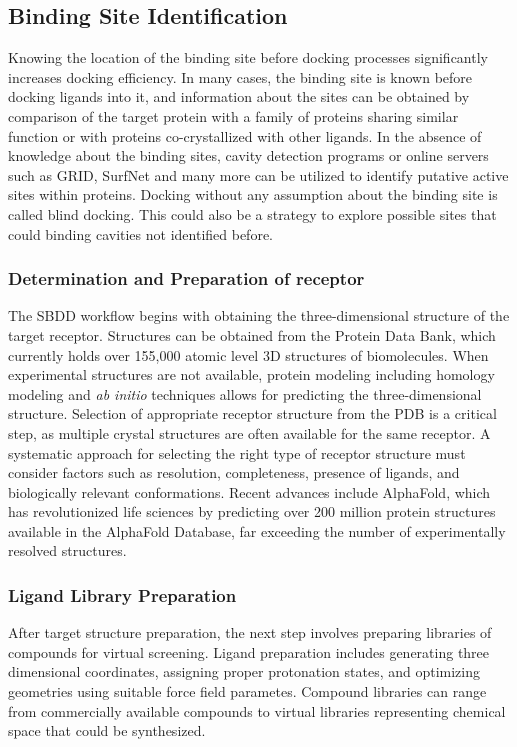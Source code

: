\documentclass[12pt, a4paper]{article}
\begin{document}
\subsection{Binding Site Identification}
Knowing the location of the binding site before docking processes significantly increases docking efficiency. In many cases, the binding site is known before docking ligands into it, and information about the sites can be obtained by comparison of the target protein with a family of proteins sharing similar function or with proteins co-crystallized with other ligands. In the absence of knowledge about the binding sites, cavity detection programs or online servers such as GRID\cite{CH1_16}, SurfNet\cite{CH1_16} and many more can be utilized to identify putative active sites within proteins. Docking without any assumption about the binding site is called blind docking. This could also be a strategy to explore possible sites that could binding cavities not identified before. 

\subsubsection{Determination and Preparation of receptor}
The SBDD workflow begins with obtaining the three-dimensional structure of the target receptor. Structures can be obtained from the Protein Data Bank, which currently holds over 155,000 atomic level 3D structures of biomolecules. When experimental structures are not available, protein modeling including homology modeling and \textit{ab initio} techniques allows for predicting the three-dimensional structure. Selection of appropriate receptor structure from the PDB is a critical step, as multiple crystal structures are often available for the same receptor. A systematic approach for selecting the right type of receptor structure must consider factors such as resolution, completeness, presence of ligands, and biologically relevant conformations. Recent advances include AlphaFold\cite{CH1_15}, which has revolutionized life sciences by predicting over 200 million protein structures available in the AlphaFold Database, far exceeding the number of experimentally resolved structures.

\subsubsection{Ligand Library Preparation}
After target structure preparation, the next step involves preparing libraries of compounds for virtual screening. Ligand preparation includes generating three dimensional coordinates, assigning proper protonation states, and optimizing geometries using suitable force field parametes. Compound libraries can range from commercially available compounds to virtual libraries representing chemical space that could be synthesized.
\end{document}
